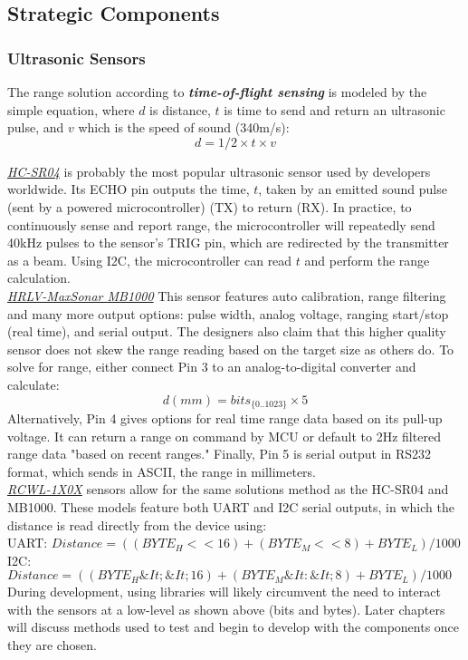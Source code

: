 \subsection{Strategic Components}

\subsubsection{Ultrasonic Sensors} \label{sssec:tof}
\noindent The range solution according to \textbf{\textit{time-of-flight sensing}} is modeled by the simple equation, where $d$ is distance, $t$ is time to send and return an ultrasonic pulse, and $v$ which is the speed of sound (340m/s):
$$d = 1/2 \times t \times v$$

\noindent \underline{\textit{HC-SR04}} is probably the most popular ultrasonic sensor used by developers worldwide. Its ECHO pin outputs the time, $t$, taken by an emitted sound pulse (sent by a powered microcontroller) (TX) to return (RX). In practice, to continuously sense and report range, the microcontroller will repeatedly send 40kHz pulses to the sensor's TRIG pin, which are redirected by the transmitter as a beam. Using I2C, the microcontroller can read $t$ and perform the range calculation.\\

\noindent \underline{\textit{HRLV-MaxSonar MB1000}} This sensor features auto calibration, range filtering and many more output options: pulse width, analog voltage, ranging start/stop (real time), and serial output. The designers also claim that this higher quality sensor does not skew the range reading based on the target size as others do. To solve for range, either connect Pin 3 to an analog-to-digital converter and calculate:
$$d (mm) = bits_{\{0..1023\}} \times 5$$
Alternatively, Pin 4 gives options for real time range data based on its pull-up voltage. It can return a range on command by MCU or default to 2Hz filtered range data "based on recent ranges." Finally, Pin 5 is serial output in RS232 format, which sends in ASCII, the range in millimeters.\\

\noindent \underline{\textit{RCWL-1X0X}} sensors allow for the same solutions method as the HC-SR04 and MB1000. These models feature both UART and I2C serial outputs, in which the distance is read directly from the device using:\\
UART: $Distance = ((BYTE_H << 16) + (BYTE_M << 8) + BYTE_L) /1000$\\
I2C: $Distance = ((BYTE_H\&It; \&It; 16) + (BYTE_M\&It: \&It; 8)+BYTE_L) /1000$\\
\noindent During development, using libraries will likely circumvent the need to interact with the sensors at a low-level as shown above (bits and bytes). Later chapters will discuss methods used to test and begin to develop with the components once they are chosen.\\

